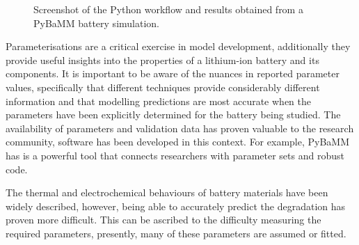 \documentclass[journal=jacsat,manuscript=article]{achemso}
\begin{document}
\begin{figure}[h]
    \centering
    \caption{\label{fig:pybamm} Screenshot of the Python workflow and results obtained from a PyBaMM battery simulation.} 
\end{figure}

Parameterisations are a critical exercise in model development, additionally they provide useful insights into the properties of a lithium-ion battery and its components. 
It is important to be aware of the nuances in reported parameter values, specifically that different techniques provide considerably different information and that modelling predictions are most accurate when the parameters have been explicitly determined for the battery being studied. 
The availability of parameters and validation data has proven valuable to the research community, software has been developed in this context. 
For example, PyBaMM has is a powerful tool that connects researchers with parameter sets and robust code.  

The thermal and electrochemical behaviours of battery materials have been widely described, however, being able to accurately predict the degradation has proven more difficult. 
This can be ascribed to the difficulty measuring the required parameters, presently, many of these parameters are assumed or fitted. 
\end{document}
